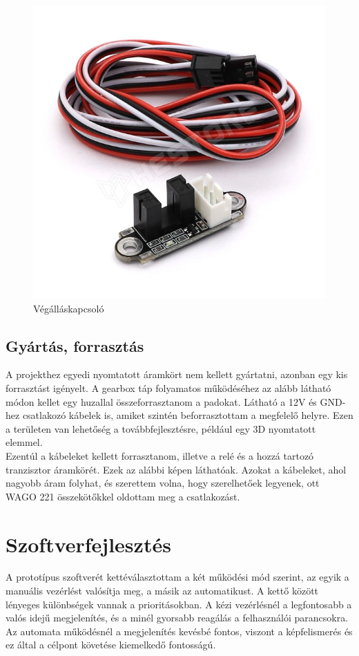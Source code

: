 \documentclass[12pt,a4paper]{article}
\begin{document}
\begin{figure}[h!]
	\centering
	\includegraphics[width=0.5\linewidth]{elek_vegallaskapcsolo}
	\caption{Végálláskapcsoló}
	\label{fig:elek_vegallaskapcsolo}
\end{figure}

\subsection{Gyártás, forrasztás}
A projekthez egyedi nyomtatott áramkört nem kellett gyártatni, azonban egy kis forrasztást igényelt. A gearbox táp folyamatos működéséhez az alább látható módon kellet egy huzallal összeforrasztanom a padokat. Látható a 12V és GND-hez csatlakozó kábelek is, amiket szintén beforrasztottam a megfelelő helyre. Ezen a területen van lehetőség a továbbfejlesztésre, például egy 3D nyomtatott elemmel.\\

Ezentúl a kábeleket kellett forrasztanom, illetve a relé és a hozzá tartozó tranzisztor áramkörét. Ezek az alábbi képen láthatóak. Azokat a kábeleket, ahol nagyobb áram folyhat, és szerettem volna, hogy szerelhetőek legyenek, ott WAGO 221 összekötőkkel oldottam meg a csatlakozást.

\pagebreak

\section{Szoftverfejlesztés}
A prototípus szoftverét kettéválasztottam a két működési mód szerint, az egyik a manuális vezérlést valósítja meg, a másik az automatikust. A kettő között lényeges különbségek vannak a prioritásokban. A kézi vezérlésnél a legfontosabb a valós idejű megjelenítés, és a minél gyorsabb reagálás a felhasználói parancsokra. Az automata működésnél a megjelenítés kevésbé fontos, viszont a képfelismerés és ez által a célpont követése kiemelkedő fontosságú.
\end{document}
